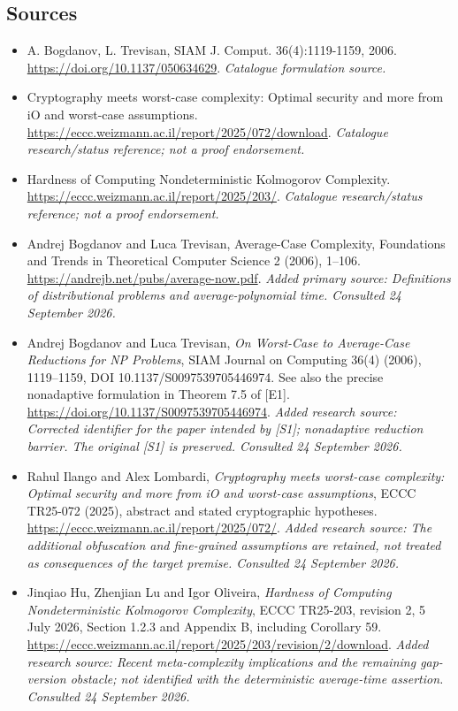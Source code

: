 \documentclass[11pt]{article}
\begin{document}
\subsection{Sources}
\begin{itemize}\raggedright
\item[\textnormal{[S1]}]\hypertarget{source:52:1}{} A. Bogdanov, L. Trevisan, SIAM J. Comput. 36(4):1119-1159, 2006.
\url{https://doi.org/10.1137/050634629}.
{\small\textit{Catalogue formulation source.}}
\item[\textnormal{[S2]}]\hypertarget{source:52:2}{} Cryptography meets worst-case complexity: Optimal security and more from iO and worst-case assumptions.
\url{https://eccc.weizmann.ac.il/report/2025/072/download}.
{\small\textit{Catalogue research/status reference; not a proof endorsement.}}
\item[\textnormal{[S3]}]\hypertarget{source:52:3}{} Hardness of Computing Nondeterministic Kolmogorov Complexity.
\url{https://eccc.weizmann.ac.il/report/2025/203/}.
{\small\textit{Catalogue research/status reference; not a proof endorsement.}}
\item[\textnormal{[E1]}]\hypertarget{extra:52:1}{} Andrej Bogdanov and Luca Trevisan, Average-Case Complexity, Foundations and Trends in Theoretical Computer Science 2 (2006), 1--106.
\url{https://andrejb.net/pubs/average-now.pdf}.
{\small\textit{Added primary source: Definitions of distributional problems and average-polynomial time. Consulted 24 September 2026.}}
\item[\textnormal{[E2]}]\hypertarget{extra:52:2}{} Andrej Bogdanov and Luca Trevisan, \emph{On Worst-Case to Average-Case Reductions for NP Problems}, SIAM Journal on Computing 36(4) (2006), 1119--1159, DOI 10.1137/S0097539705446974. See also the precise nonadaptive formulation in Theorem 7.5 of [E1].
\url{https://doi.org/10.1137/S0097539705446974}.
{\small\textit{Added research source: Corrected identifier for the paper intended by [S1]; nonadaptive reduction barrier. The original [S1] is preserved. Consulted 24 September 2026.}}
\item[\textnormal{[E3]}]\hypertarget{extra:52:3}{} Rahul Ilango and Alex Lombardi, \emph{Cryptography meets worst-case complexity: Optimal security and more from iO and worst-case assumptions}, ECCC TR25-072 (2025), abstract and stated cryptographic hypotheses.
\url{https://eccc.weizmann.ac.il/report/2025/072/}.
{\small\textit{Added research source: The additional obfuscation and fine-grained assumptions are retained, not treated as consequences of the target premise. Consulted 24 September 2026.}}
\item[\textnormal{[E4]}]\hypertarget{extra:52:4}{} Jinqiao Hu, Zhenjian Lu and Igor Oliveira, \emph{Hardness of Computing Nondeterministic Kolmogorov Complexity}, ECCC TR25-203, revision 2, 5 July 2026, Section 1.2.3 and Appendix B, including Corollary 59.
\url{https://eccc.weizmann.ac.il/report/2025/203/revision/2/download}.
{\small\textit{Added research source: Recent meta-complexity implications and the remaining gap-version obstacle; not identified with the deterministic average-time assertion. Consulted 24 September 2026.}}
\end{itemize}
\end{document}
